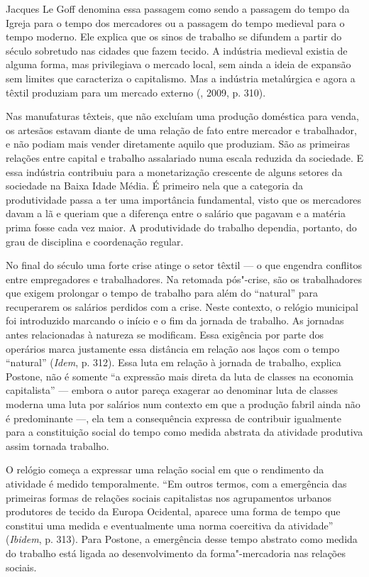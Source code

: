 Jacques Le Goff denomina essa passagem como sendo a passagem do
tempo da Igreja para o tempo dos mercadores ou a passagem do tempo
medieval para o tempo moderno. Ele explica que os sinos de trabalho se
difundem a partir do século  sobretudo nas cidades que fazem tecido.
A indústria medieval existia de alguma forma, mas privilegiava o mercado
local, sem ainda a ideia de expansão sem limites que caracteriza o
capitalismo. Mas a indústria metalúrgica e agora a têxtil produziam para
um mercado externo (, 2009, p. 310).

Nas manufaturas têxteis, que não excluíam uma produção doméstica para
venda, os artesãos estavam diante de uma relação de fato entre
mercador e trabalhador, e não podiam mais vender diretamente aquilo que
produziam. São as primeiras relações entre capital e trabalho
assalariado numa escala reduzida da sociedade. E essa indústria
contribuiu para a monetarização crescente de alguns setores da sociedade
na Baixa Idade Média. É primeiro nela que a categoria da produtividade
passa a ter uma importância fundamental, visto que os mercadores davam a
lã e queriam que a diferença entre o salário que pagavam e a matéria
prima fosse cada vez maior. A produtividade do trabalho dependia,
portanto, do grau de disciplina e coordenação regular.

No final do século  uma forte crise atinge o setor têxtil --- o que
engendra conflitos entre empregadores e trabalhadores. Na retomada
pós"-crise, são os trabalhadores que exigem prolongar o tempo de trabalho
para além do ``natural'' para recuperarem os salários perdidos com a
crise. Neste contexto, o relógio municipal foi introduzido marcando o
início e o fim da jornada de trabalho. As jornadas antes relacionadas à
natureza se modificam. Essa exigência por parte dos operários marca
justamente essa distância em relação aos laços com o tempo ``natural''
(\emph{Idem}, p. 312). Essa luta em relação à jornada de trabalho,
explica Postone, não é somente ``a expressão mais direta da luta de
classes na economia capitalista'' --- embora o autor pareça exagerar ao
denominar luta de classes moderna uma luta por salários num contexto em
que a produção fabril ainda não é predominante ---, ela tem a
consequência expressa de contribuir igualmente para a constituição
social do tempo como medida abstrata da atividade produtiva assim
tornada trabalho.

O relógio começa a expressar uma relação social em que o
rendimento da atividade é medido temporalmente. ``Em outros termos, com
a emergência das primeiras formas de relações sociais capitalistas nos
agrupamentos urbanos produtores de tecido da Europa Ocidental, aparece
uma forma de tempo que constitui uma medida e eventualmente uma norma
coercitiva da atividade'' (\emph{Ibidem}, p. 313). Para Postone, a
emergência desse tempo abstrato como medida do trabalho está ligada ao
desenvolvimento da forma"-mercadoria nas relações sociais.

